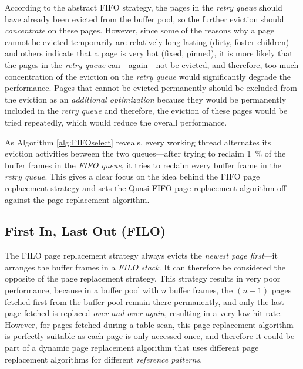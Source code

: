     According to the abstract FIFO strategy, the pages in the \textit{retry queue} should have already been evicted from the buffer pool, so the further eviction should \emph{concentrate} on these pages. However, since some of the reasons why a page cannot be evicted temporarily are relatively long-lasting (dirty, foster children) and others indicate that a page is very hot (fixed, pinned), it is more likely that the pages in the \textit{retry queue} can---again---not be evicted, and therefore, too much concentration of the eviction on the \textit{retry queue} would significantly degrade the performance. Pages that cannot be evicted permanently should be excluded from the eviction as an \emph{additional optimization} because they would be permanently included in the \textit{retry queue} and therefore, the eviction of these pages would be tried repeatedly, which would reduce the overall performance.

    As Algorithm \ref{alg:FIFOselect} reveals, every working thread alternates its eviction activities between the two queues---after trying to reclaim \SI{1}{\percent} of the buffer frames in the \textit{FIFO queue}, it tries to reclaim every buffer frame in the \textit{retry queue}. This gives a clear focus on the idea behind the FIFO page replacement strategy and sets the Quasi-FIFO page replacement algorithm off against the  page replacement algorithm.

\subsection[FILO]{First In, Last Out (FILO)} \label{subsec:filo}

    The FILO page replacement strategy always evicts the \emph{newest page first}---it arranges the buffer frames in a \emph{FILO stack}. It can therefore be considered the opposite of the  page replacement strategy. This strategy results in very poor performance, because in a buffer pool with $n$ buffer frames, the $(n-1)$ pages fetched first from the buffer pool remain there permanently, and only the last page fetched is replaced \emph{over and over again}, resulting in a very low hit rate. However, for pages fetched during a table scan, this page replacement algorithm is perfectly suitable as each page is only accessed once, and therefore it could be part of a dynamic page replacement algorithm that uses different page replacement algorithms for different \emph{reference patterns}.

